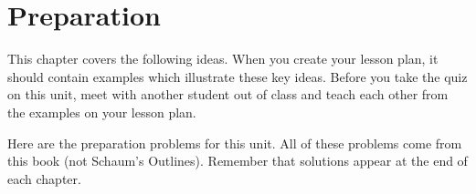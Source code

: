 \section{Preparation}

\noindent
This chapter covers the following ideas. When you create your lesson plan, it should contain examples which illustrate these key ideas. Before you take the quiz on this unit, meet with another student out of class and teach each other from the examples on your lesson plan. 



Here are the preparation problems for this unit.  All of these problems come from this book (not Schaum's Outlines).  Remember that solutions appear at the end of each chapter.



